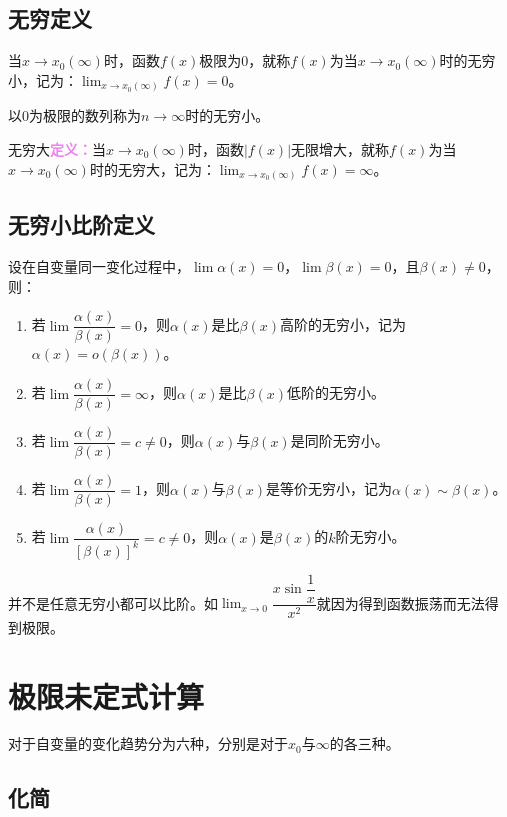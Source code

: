 \documentclass[UTF8]{ctexart}
\begin{document}
\subsection{无穷定义}

当$x\to x_0(\infty)$时，函数$f(x)$极限为0，就称$f(x)$为当$x\to x_0(\infty)$时的无穷小，记为：$\lim_{x\to x_0(\infty)}f(x)=0$。

以0为极限的数列称为$n\to\infty$时的无穷小。

无穷大\textcolor{violet}{\textbf{定义：}}当$x\to x_0(\infty)$时，函数$\vert f(x)\vert$无限增大，就称$f(x)$为当$x\to x_0(\infty)$时的无穷大，记为：$\lim_{x\to x_0(\infty)}f(x)=\infty$。

\subsection{无穷小比阶定义}

设在自变量同一变化过程中，$\lim\alpha(x)=0$，$\lim\beta(x)=0$，且$\beta(x)\neq 0$，则：

\begin{enumerate}
    \item 若$\lim\dfrac{\alpha(x)}{\beta(x)}=0$，则$\alpha(x)$是比$\beta(x)$高阶的无穷小，记为$\alpha(x)=o(\beta(x))$。
    \item 若$\lim\dfrac{\alpha(x)}{\beta(x)}=\infty$，则$\alpha(x)$是比$\beta(x)$低阶的无穷小。
    \item 若$\lim\dfrac{\alpha(x)}{\beta(x)}=c\neq 0$，则$\alpha(x)$与$\beta(x)$是同阶无穷小。
    \item 若$\lim\dfrac{\alpha(x)}{\beta(x)}=1$，则$\alpha(x)$与$\beta(x)$是等价无穷小，记为$\alpha(x)\sim\beta(x)$。
    \item 若$\lim\dfrac{\alpha(x)}{[\beta(x)]^k}=c\neq 0$，则$\alpha(x)$是$\beta(x)$的$k$阶无穷小。
\end{enumerate}

并不是任意无穷小都可以比阶。如$\lim_{x\to 0}\dfrac{x\sin\dfrac{1}{x}}{x^2}$就因为得到函数振荡而无法得到极限。

\section{极限未定式计算}

对于自变量的变化趋势分为六种，分别是对于$x_0$与$\infty$的各三种。

\subsection{化简}
\end{document}
